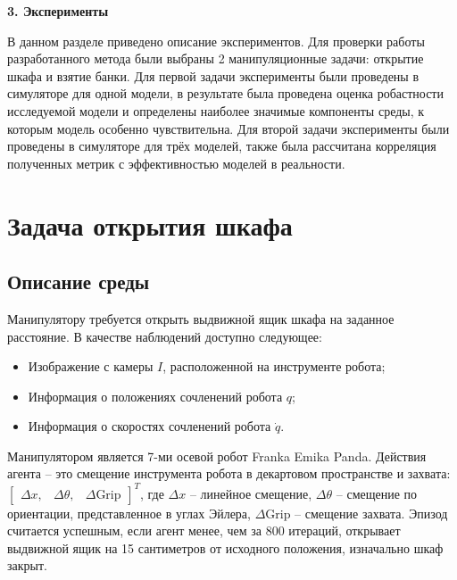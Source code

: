 \newpage
\begin{center}
  \textbf{\large 3. Эксперименты}
\end{center}

В данном разделе приведено описание экспериментов. Для проверки работы разработанного метода были выбраны 2 манипуляционные задачи: открытие шкафа и взятие банки. Для первой задачи эксперименты были проведены в симуляторе для одной модели, в результате была проведена оценка робастности исследуемой модели и определены наиболее значимые компоненты среды, к которым модель особенно чувствительна. Для второй задачи эксперименты были проведены в симуляторе для трёх моделей, также была рассчитана корреляция полученных метрик с эффективностью моделей в реальности. 

\section{Задача открытия шкафа}

    \subsection{Описание среды}

        Манипулятору требуется открыть выдвижной ящик шкафа на заданное расстояние. В качестве наблюдений доступно следующее:

        \begin{itemize}
            \item Изображение с камеры $I$, расположенной на инструменте робота;
            \item Информация о положениях сочленений робота $q$;
            \item Информация о скоростях сочленений робота $\dot{q}$.
        \end{itemize}

        Манипулятором является 7-ми осевой робот Franka Emika Panda. Действия агента -- это смещение инструмента робота в декартовом пространстве и захвата: $\begin{bmatrix} \Delta x, & \Delta \theta, & \Delta \text{Grip} \end{bmatrix}^T$, где $\Delta x$ -- линейное смещение, $\Delta \theta$ -- смещение по ориентации, представленное в углах Эйлера, $\Delta \text{Grip}$ -- смещение захвата.  Эпизод считается успешным, если агент менее, чем за 800 итераций, открывает выдвижной ящик на 15 сантиметров от исходного положения, изначально шкаф закрыт. 
        
